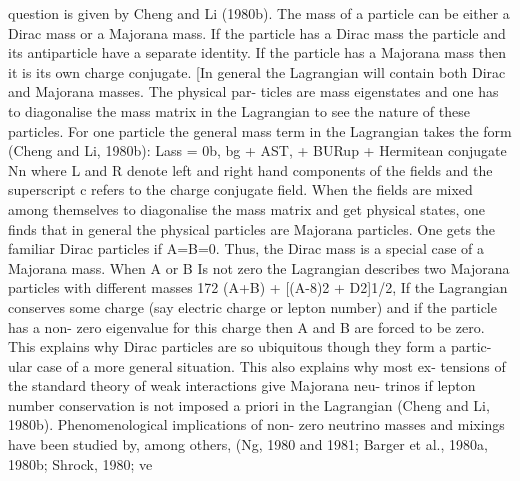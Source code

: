 \documentclass[twoside]{article}
\begin{document}
{{{{{{question is given by Cheng and Li (1980b). The mass of a particle can be
either a Dirac mass or a Majorana mass. If the particle has a Dirac mass
the particle and its antiparticle have a separate identity. If the particle
has a Majorana mass then it is its own charge conjugate. [In general the
Lagrangian will contain both Dirac and Majorana masses. The physical par-
ticles are mass eigenstates and one has to diagonalise the mass matrix in
the Lagrangian to see the nature of these particles. For one particle the
general mass term in the Lagrangian takes the form (Cheng and Li, 1980b):
Lass = 0b, bg + AST, + BURup + Hermitean conjugate Nn
where L and R denote left and right hand components of the fields and
the superscript c refers to the charge conjugate field. When the fields
are mixed among themselves to diagonalise the mass matrix and get physical
states, one finds that in general the physical particles are Majorana
particles. One gets the familiar Dirac particles if A=B=0. Thus, the
Dirac mass is a special case of a Majorana mass. When A or B Is not zero
the Lagrangian describes two Majorana particles with different masses
172 {(A+B) + [(A-8)2 + D2]1/2}, If the Lagrangian conserves some charge
(say electric charge or lepton number) and if the particle has a non-
zero eigenvalue for this charge then A and B are forced to be zero. This
explains why Dirac particles are so ubiquitous though they form a partic-
ular case of a more general situation. This also explains why most ex-
tensions of the standard theory of weak interactions give Majorana neu-
trinos if lepton number conservation is not imposed a priori in the
Lagrangian (Cheng and Li, 1980b). Phenomenological implications of non-
zero neutrino masses and mixings have been studied by, among others,
(Ng, 1980 and 1981; Barger et al., 1980a, 1980b; Shrock, 1980;
ve

}}}}}}
\end{document}

